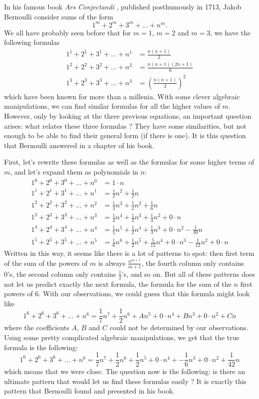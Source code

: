In his famous book \textit{Ars Conjectandi} \cite{bernoulli1713ars}, published posthumously in 1713, Jakob Bernoulli consider sums of the form
$$1^m + 2^m + 3^m + \dots + n^m.$$
We all have probably seen before that for $m=1$, $m = 2$ and $m=3$, we have the following formulas
\begin{align*}
    1^1 + 2^1 + 3^1 + \dots + n^1 &= \frac{n(n+1)}{2} \\
    1^2 + 2^2 + 3^2 + \dots + n^2 &= \frac{n(n+1)(2n+1)}{6} \\
    1^3 + 2^3 + 3^3 + \dots + n^3 &= \left(\frac{n(n+1)}{2}\right)^2
\end{align*}
which have been known for more than a millenia. With some clever algebraic manipulations, we can find similar formulas for all the higher values of $m$. However, only by looking at the three previous equations, an important question arises: what relates these three formulas ? They have some similarities, but not enough to be able to find their general form (if there is one). It is this question that Bernoulli answered in a chapter of his book.

First, let's rewrite these formulas as well as the formulas for some higher terms of $m$, and let's expand them as polynomials in $n$:
\begin{align*}
    1^0 + 2^0 + 3^0 + \dots + n^0 &= 1\cdot n \\
    1^1 + 2^1 + 3^1 + \dots + n^1 &= \frac{1}{2}n^2 + \frac{1}{2}n \\
    1^2 + 2^2 + 3^2 + \dots + n^2 &= \frac{1}{3}n^3 + \frac{1}{2}n^2 + \frac{1}{6}n \\
    1^3 + 2^3 + 3^3 + \dots + n^3 &= \frac{1}{4}n^4 + \frac{1}{2}n^3 + \frac{1}{4}n^2 + 0\cdot n \\
    1^4 + 2^4 + 3^4 + \dots + n^4 &= \frac{1}{5}n^5 + \frac{1}{2}n^4 + \frac{1}{3}n^3 + 0\cdot n^2 - \frac{1}{30}n \\
    1^5 + 2^5 + 3^5 + \dots + n^5 &= \frac{1}{6}n^6 + \frac{1}{2}n^5 + \frac{5}{12}n^4 + 0\cdot n^3 - \frac{1}{12}n^2 + 0\cdot n
\end{align*}
Written in this way, it seems like there is a lot of patterns to spot: then first term of the sum of the powers of $m$ is always $\frac{n^{m+1}}{m+1}$, the fourth column only contains 0's, the second column only contains $\frac{1}{2}$'s, and so on. But all of these patterns does not let us predict exactly the next formula, the formula for the sum of the $n$ first powers of 6. With our observations, we could guess that this formula might look like
$$1^6 + 2^6 + 3^6 + \dots + n^6 = \frac{1}{7}n^7 + \frac{1}{2}n^6 + An^5 + 0\cdot n^4 + Bn^3 + 0\cdot n^2 + Cn$$
where the coefficients $A$, $B$ and $C$ could not be determined by our observations. Using some pretty complicated algebraic manipulations, we get that the true formula is the following:
$$1^6 + 2^6 + 3^6 + \dots + n^6 = \frac{1}{7}n^7 + \frac{1}{2}n^6 + \frac{1}{2}n^5 + 0\cdot n^4 + -\frac{1}{6}n^3 + 0\cdot n^2 + \frac{1}{42}n$$
which means that we were close. The question now is the following: is there an ultimate pattern that would let us find these formulas easily ? It is exactly this pattern that Bernoulli found and presented in his book.

